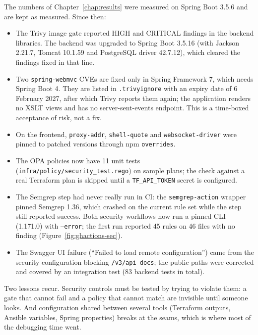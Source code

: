 The numbers of Chapter~\ref{chap:results} were measured on Spring Boot 3.5.6 and are kept as measured. Since then:
\begin{itemize}
  \item The Trivy image gate reported HIGH and CRITICAL findings in the backend libraries. The backend was upgraded to Spring Boot 3.5.16 (with Jackson 2.21.7, Tomcat 10.1.59 and PostgreSQL driver 42.7.12), which cleared the findings fixed in that line.
  \item Two \texttt{spring-webmvc} CVEs are fixed only in Spring Framework 7, which needs Spring Boot 4. They are listed in \texttt{.trivyignore} with an expiry date of 6 February 2027, after which Trivy reports them again; the application renders no XSLT views and has no server-sent-events endpoint. This is a time-boxed acceptance of risk, not a fix.
  \item On the frontend, \texttt{proxy-addr}, \texttt{shell-quote} and \texttt{websocket-driver} were pinned to patched versions through npm \texttt{overrides}.
  \item The OPA policies now have 11 unit tests (\texttt{infra/policy/security\_test.rego}) on sample plans; the check against a real Terraform plan is skipped until a \texttt{TF\_API\_TOKEN} secret is configured.
  \item The Semgrep step had never really run in CI: the \texttt{semgrep-action} wrapper pinned Semgrep 1.36, which crashed on the current rule set while the step still reported success. Both security workflows now run a pinned CLI (1.171.0) with \texttt{--error}; the first run reported 45 rules on 46 files with no finding (Figure~\ref{fig:ghactions-sec}).
  \item The Swagger UI failure (``Failed to load remote configuration'') came from the security configuration blocking \texttt{/v3/api-docs}; the public paths were corrected and covered by an integration test (83 backend tests in total).
\end{itemize}

Two lessons recur. Security controls must be tested by trying to violate them: a gate that cannot fail and a policy that cannot match are invisible until someone looks. And configuration shared between several tools (Terraform outputs, Ansible variables, Spring properties) breaks at the seams, which is where most of the debugging time went.
